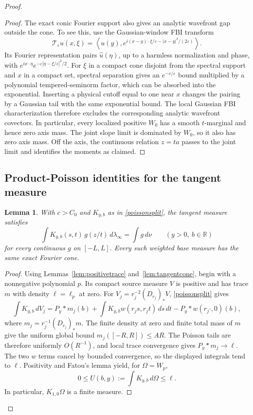 \documentclass[11pt]{article}
\newtheorem{lemma}[theorem]{Lemma}
\newcommand{\R}{\mathbb R}
\begin{document}
\begin{proof}
\begin{proof}
The exact conic Fourier support also gives an analytic wavefront gap outside the cone. To see this, use the Gaussian-window FBI transform
\[
 \mathcal T_\varepsilon u(x,\xi)
 =\left\langle u(y),
 e^{i(x-y)\cdot\xi/\varepsilon-|x-y|^2/(2\varepsilon)}
 \right\rangle.
\]
Its Fourier representation pairs $\widehat u(\eta)$, up to a harmless normalization and phase, with
$e^{ix\cdot\eta}e^{-\varepsilon|\eta-\xi/\varepsilon|^2/2}$.
For $\xi$ in a compact cone disjoint from the spectral support and $x$ in a compact set, spectral separation gives an $e^{-c/\varepsilon}$ bound multiplied by a polynomial tempered-seminorm factor, which can be absorbed into the exponential. Inserting a physical cutoff equal to one near $x$ changes the pairing by a Gaussian tail with the same exponential bound. The local Gaussian FBI characterization \cite[Appendix B, Proposition B.1]{SW} therefore excludes the corresponding analytic wavefront covectors. In particular, every localized positive $W_0$ has a smooth $t$-marginal and hence zero axis mass. The joint slope limit is dominated by $W_0$, so it also has zero axis mass. Off the axis, the continuous relation $z=ta$ passes to the joint limit and identifies the moments as claimed.
\end{proof}

\subsection{Product-Poisson identities for the tangent measure}
\begin{lemma}\label{lem:tangentpoisson}
With $c>C_0$ and $K_{y,b}$ as in \eqref{poissonsplit}, the tangent measure satisfies
\begin{equation}\label{allpoisson}
 \int K_{y,b}(s,t)\,g(z/t)\,d\lambda_\infty
 =\int g\,d\nu\qquad(y>0,\ b\in\R)
\end{equation}
for every continuous $g$ on $[-L,L]$. Every such weighted base measure has the same exact Fourier cone.
\end{lemma}
\begin{proof}
Using Lemmas~\ref{lem:positivetrace} and~\ref{lem:tangentcone}, begin with a nonnegative polynomial $p$. Its compact source measure $V$ is positive and has trace $m$ with density $\ell=\ell_p$ at zero. For $V_j=r_j^{-2}(D_{r_j})_*V$, \eqref{poissonsplit} gives
\[
 \int K_{y,b}\,dV_j=P_y*m_j(b)
 +\int K_{y,b}w(r_js,r_jt)\,ds\,dt
 -P_y*w(r_j\cdot,0)(b),
\]
where $m_j=r_j^{-1}(D_{r_j})_*m$. The finite density at zero and finite total mass of $m$ give the uniform global bound $m_j([-R,R])\le AR$. The Poisson tails are therefore uniformly $O(R^{-1})$, and local trace convergence gives $P_y*m_j\to\ell$. The two $w$ terms cancel by bounded convergence, so the displayed integrals tend to $\ell$. Positivity and Fatou's lemma yield, for $\Omega=W_p$,
\begin{equation}\label{poissonfatou}
 0\le U(b,y):=\int K_{y,b}\,d\Omega\le\ell.
\end{equation}
In particular, $K_{1,0}\Omega$ is a finite measure.


\end{proof}
\end{proof}
\end{document}
